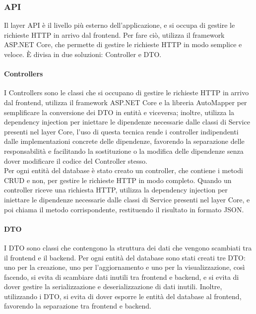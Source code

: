 \subsubsection{API}
Il layer API è il livello più esterno dell'applicazione, e si occupa di gestire le richieste HTTP in arrivo dal frontend. Per fare ciò, utilizza il framework ASP.NET Core, che permette di gestire le richieste HTTP in modo semplice e veloce.
È divisa in due soluzioni: Controller e DTO.\\
\paragraph{Controllers}
I Controllers sono le classi che si occupano di gestire le richieste HTTP in arrivo dal frontend, utilizza il framework ASP.NET Core e la libreria AutoMapper per semplificare la conversione dei DTO in entità e viceversa; inoltre, utilizza la dependency injection per iniettare le dipendenze necessarie dalle classi di Service presenti nel layer Core, l'uso di questa tecnica rende i controller indipendenti dalle implementazioni concrete delle dipendenze, favorendo la separazione delle responsabilità e facilitando la sostituzione o la modifica delle dipendenze senza dover modificare il codice del Controller stesso.\\
Per ogni entità del database è stato creato un controller, che contiene i metodi CRUD e non, per gestire le richieste HTTP in modo completo. Quando un controller riceve una richiesta HTTP, utilizza la dependency injection per iniettare le dipendenze necessarie dalle classi di Service presenti nel layer Core, e poi chiama il metodo corrispondente, restituendo il risultato in formato JSON.\\

\paragraph{DTO}
I DTO sono classi che contengono la struttura dei dati che vengono scambiati tra il frontend e il backend.
Per ogni entità del database sono stati creati tre DTO: uno per la creazione, uno per l'aggiornamento e uno per la visualizzazione, così facendo, si evita di scambiare dati inutili tra frontend e backend, e si evita di dover gestire la serializzazione e deserializzazione di dati inutili. Inoltre, utilizzando i DTO, si evita di dover esporre le entità del database al frontend, favorendo la separazione tra frontend e backend.\\

